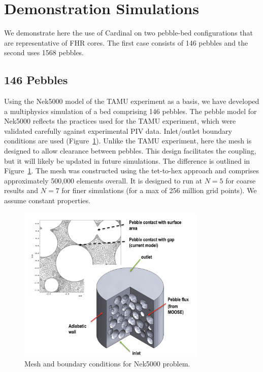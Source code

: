 \section{Demonstration Simulations}
\label{s:demo}

We demonstrate here the use of Cardinal on two pebble-bed configurations
that are representative of FHR cores.  The first case consists of 146
pebbles and the second uses 1568 pebbles.

\subsection{146 Pebbles}
\label{ss:c4}

Using the Nek5000 model of the TAMU experiment as a basis, we have developed a
multiphysics simulation of a bed comprising 146 pebbles.  The pebble model for
Nek5000 reflects the practices used for the TAMU experiment, which were
validated carefully against experimental PIV data. Inlet/outlet boundary
conditions are used (Figure~\ref{f:pb2}). Unlike the TAMU experiment, here the
mesh is designed to allow clearance between pebbles. This design facilitates
the coupling, but it will likely be updated in future simulations. The
difference is outlined in Figure~\ref{f:pb2}. The mesh was constructed
using the tet-to-hex approach and comprises approximately 500,000 elements
overall. It is designed to run at $N=5$ for coarse results and $N=7$ for
finer simulations (for a max of 256 million grid points). We
assume constant properties.

\begin{figure}[!h]
\centering
\includegraphics[clip=true,width=0.8\textwidth]{Figures/pb_mesh}
\caption{Mesh and boundary conditions for Nek5000 problem.}
\label{f:pb2}
\end{figure}

